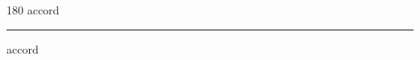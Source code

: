 
\begin{frame}
\begin{center}
\begin{turn}{180}
{\fontsize{2.5cm}{1em}\selectfont accord}
\end{turn}
\vspace{1em}\par  
\hrule
\vspace{1em}\par  
{\fontsize{2.5cm}{1em}\selectfont accord}
\end{center}
\end{frame}
